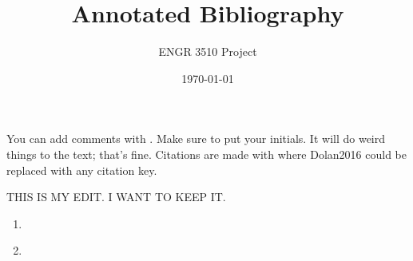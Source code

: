 \documentclass[12pt,letterpaper]{article}
\begin{document}
\title{Annotated Bibliography}
\author{ENGR 3510 Project}
\date{\today}
\maketitle

You can add comments with . Make sure to put your initials. It will do weird things to the text; that's fine. 
Citations are made with \cite{Dolan2016} where Dolan2016 could be replaced with any citation key. 


THIS IS MY EDIT. I WANT TO KEEP IT.

\begin{enumerate}
	\item \cite{Dolan2016}  
	\item \cite{J.EllisBell2015}  
\end{enumerate}

\printbibliography
\end{document}

